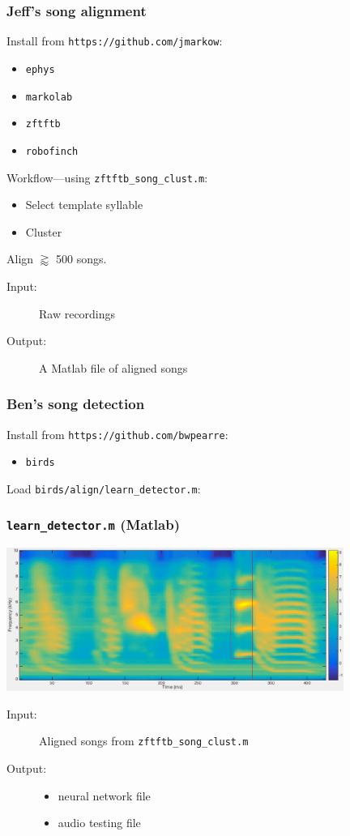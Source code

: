 \documentclass{beamer}
\begin{document}
\begin{frame}
  \frametitle{Jeff's song alignment}
  Install from {\tt https://github.com/jmarkow}:
  \begin{itemize}
    \item {\tt ephys}
    \item {\tt markolab}
    \item {\tt zftftb}
    \item {\tt robofinch}
  \end{itemize}
  Workflow---using {\tt zftftb\_song\_clust.m}:
  \begin{itemize}
    \item Select template syllable
    \item Cluster
  \end{itemize}

  \noindent Align $\gtrapprox$ 500 songs.
  \begin{description}
    \item[Input:] Raw recordings
    \item[Output:] A Matlab file of aligned songs
  \end{description}
\end{frame}

\begin{frame}
  \frametitle{Ben's song detection}
  Install from {\tt https://github.com/bwpearre}:
  \begin{itemize}
    \item {\tt birds}
  \end{itemize}
  Load {\tt birds/align/learn\_detector.m}:

\end{frame}

\begin{frame}
  \frametitle{{\tt learn\_detector.m} (Matlab)}
  \includegraphics[width=11cm]{song-spectrogram-with-alignment-1}

  \begin{description}
    \item[Input:] Aligned songs from {\tt zftftb\_song\_clust.m}
    \item[Output:]
      \begin{itemize}
      \item neural network file
      \item audio testing file
      \end{itemize}
  \end{description}
      
\end{frame}
\end{document}
